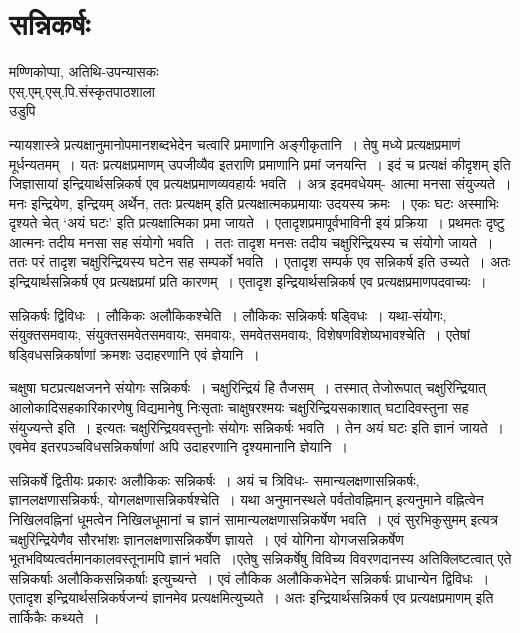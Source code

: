 {\fontsize{15}{17}\selectfont
\presetvalues
\chapter{सन्निकर्षः}

\begin{center}
\smallskip
मण्णिकोप्पा,
\smallskip
अतिथि-उपन्यासकः\\
एस्.एम्.एस्.पि.संस्कृतपाठशाला\\
उडुपि
\addrule
\end{center} 
न्यायशास्त्रे प्रत्यक्षानुमानोपमानशब्दभेदेन चत्वारि प्रमाणानि अङ्गीकृतानि~। तेषु मध्ये प्रत्यक्ष\-प्रमाणं मूर्धन्यतमम्~। यतः प्रत्यक्षप्रमाणम् उपजीव्यैव इतराणि प्रमाणानि प्रमां जनयन्ति~। इदं च प्रत्यक्षं कीदृशम् इति जिज्ञासायां इन्द्रियार्थसन्निकर्ष एव प्रत्यक्षप्रमाणव्यवहार्यः भवति~। अत्र इदमवधेयम्- आत्मा मनसा संयुज्यते~। मनः इन्द्रियेण, इन्द्रियम् अर्थेन, ततः प्रत्यक्षम् इति प्रत्यक्षात्मकप्रमायाः उदयस्य क्रमः~। एकः घटः अस्माभिः दृश्यते चेत् ‘अयं घटः’ इति प्रत्यक्षात्मिका प्रमा जायते~। एतादृशप्रमापूर्वभाविनी इयं प्रक्रिया~। प्रथमतः दृष्टु आत्मनः \hbox{तदीय} मनसा सह संयोगो भवति~। ततः तादृश मनसः तदीय चक्षुरिन्द्रियस्य च संयोगो जायते~। ततः परं तादृश चक्षुरिन्द्रियस्य घटेन सह सम्पर्को भवति~। एतादृश सम्पर्क एव सन्निकर्ष इति उच्यते~। अतः इन्द्रियार्थसन्निकर्ष एव प्रत्यक्षप्रमां प्रति कारणम्~। एतादृश इन्द्रियार्थसन्निकर्ष एव प्रत्यक्षप्रमाणपदवाच्यः~। 
\vskip 4pt

सन्निकर्षः द्विविधः~। लौकिकः अलौकिकश्चेति~। लौकिकः सन्निकर्षः षड्विधः~। यथा-संयोगः, संयुक्तसमवायः, संयुक्तसमवेतसमवायः, समवायः, समवेतसमवायः, विशेषण\-विशेष्यभावश्चेति~। एतेषां षड्विधसन्निकर्षाणां क्रमशः उदाहरणानि एवं ज्ञेयानि~। 
\vskip 4pt

चक्षुषा घटप्रत्यक्षजनने संयोगः सन्निकर्षः~। चक्षुरिन्द्रियं हि तैजसम्~। तस्मात् तेजोरूपात् चक्षुरिन्द्रियात् आलोकादिसहकारिकारणेषु विद्यमानेषु निःसृताः चाक्षुषरश्मयः चक्षुरिन्द्रियसकाशात् घटादिवस्तुना सह संयुज्यन्ते इति~। इत्यतः चक्षुरिन्द्रियवस्तुनोः संयोगः सन्निकर्षः भवति~। तेन अयं घटः इति ज्ञानं जायते~। एवमेव इतरपञ्चविधसन्निकर्षाणां अपि उदाहरणानि दृश्यमानानि ज्ञेयानि~।            

सन्निकर्षे द्वितीयः प्रकारः अलौकिकः सन्निकर्षः~। अयं च त्रिविधः- समान्यलक्षणा\-सन्निकर्षः, ज्ञानलक्षणासन्निकर्षः, योगलक्षणासन्निकर्षश्चेति~। यथा अनुमानस्थले पर्वतो\break वह्निमान् इत्यनुमाने वह्नित्वेन निखिलवह्निनां धूमत्वेन निखिलधूमानां च ज्ञानं सामान्यलक्षणासन्निकर्षेण भवति~। एवं सुरभिकुसुमम् इत्यत्र चक्षुरिन्द्रियेणैव सौरभांशः ज्ञानलक्षणासन्निकर्षेण ज्ञायते~। एवं योगिना योगजसन्निकर्षेण भूतभविष्यत्वर्तमानकालवस्तूनामपि ज्ञानं भवति~।\break एतेषु सन्निकर्षेषु विविच्य विवरणदानस्य अतिक्लिष्टत्वात् एते सन्निकर्षाः अलौकिकसन्निकर्षाः इत्युच्यन्ते~। एवं लौकिक अलौकिकभेदेन सन्निकर्षः प्राधान्येन द्विविधः~। एतादृश इन्द्रियार्थसन्निकर्षजन्यं ज्ञानमेव प्रत्यक्षमित्युच्यते~। अतः  इन्द्रियार्थसन्निकर्ष एव प्रत्यक्षप्रमाणम् इति तार्किकैः कथ्यते~। 

\articleend
}
